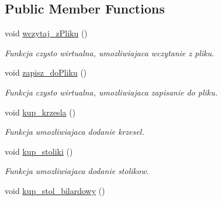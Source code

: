 \subsection*{Public Member Functions}
\begin{DoxyCompactItemize}
\item 
\hypertarget{class_wiejska_a0ca71e49d6503eba63a04e12a3f3539f}{}void \hyperlink{class_wiejska_a0ca71e49d6503eba63a04e12a3f3539f}{wczytaj\+\_\+z\+Pliku} ()\label{class_wiejska_a0ca71e49d6503eba63a04e12a3f3539f}

\begin{DoxyCompactList}\small\item\em Funkcja czysto wirtualna, umozliwiajaca wczytanie z pliku. \end{DoxyCompactList}\item 
\hypertarget{class_wiejska_a625c01c80cc223184a2e3c50b7749c96}{}void \hyperlink{class_wiejska_a625c01c80cc223184a2e3c50b7749c96}{zapisz\+\_\+do\+Pliku} ()\label{class_wiejska_a625c01c80cc223184a2e3c50b7749c96}

\begin{DoxyCompactList}\small\item\em Funkcja czysto wirtualna, umozliwiajaca zapisanie do pliku. \end{DoxyCompactList}\item 
\hypertarget{class_wiejska_adedd94a38deb6f196a0966d477d404f2}{}void \hyperlink{class_wiejska_adedd94a38deb6f196a0966d477d404f2}{kup\+\_\+krzesla} ()\label{class_wiejska_adedd94a38deb6f196a0966d477d404f2}

\begin{DoxyCompactList}\small\item\em Funkcja umozliwiajaca dodanie krzesel. \end{DoxyCompactList}\item 
\hypertarget{class_wiejska_adc172ccf73df677e0d343faab76a9952}{}void \hyperlink{class_wiejska_adc172ccf73df677e0d343faab76a9952}{kup\+\_\+stoliki} ()\label{class_wiejska_adc172ccf73df677e0d343faab76a9952}

\begin{DoxyCompactList}\small\item\em Funkcja umozliwiajaca dodanie stolikow. \end{DoxyCompactList}\item 
\hypertarget{class_wiejska_a9b28e7cff9b4706522205fcda30371cc}{}void \hyperlink{class_wiejska_a9b28e7cff9b4706522205fcda30371cc}{kup\+\_\+stol\+\_\+bilardowy} ()\label{class_wiejska_a9b28e7cff9b4706522205fcda30371cc}


\end{DoxyCompactItemize}
